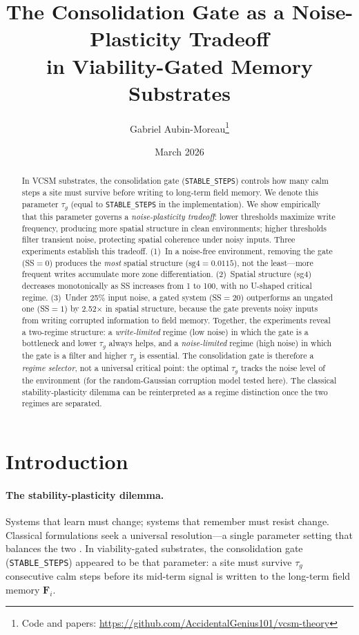 \documentclass[11pt,twocolumn]{article}
\title{\textbf{The Consolidation Gate as a Noise-Plasticity Tradeoff\\
in Viability-Gated Memory Substrates}}
\author{Gabriel Aubin-Moreau\thanks{Code and papers: \url{https://github.com/AccidentalGenius101/vcsm-theory}}}
\date{March 2026}
\begin{document}
\maketitle

\begin{abstract}
In VCSM substrates, the consolidation gate (\texttt{STABLE\_STEPS}) controls
how many calm steps a site must survive before writing to long-term field memory.
We denote this parameter $\tau_g$ (equal to \texttt{STABLE\_STEPS} in the implementation).
We show empirically that this parameter governs a \emph{noise-plasticity tradeoff}:
lower thresholds maximize write frequency, producing more spatial structure in
clean environments; higher thresholds filter transient noise, protecting spatial
coherence under noisy inputs.
Three experiments establish this tradeoff.
(1)~In a noise-free environment, removing the gate (SS$=0$) produces the
\emph{most} spatial structure ($\text{sg4} = 0.0115$), not the least---more
frequent writes accumulate more zone differentiation.
(2)~Spatial structure (sg4) decreases monotonically as SS increases from 1 to 100,
with no U-shaped critical regime.
(3)~Under 25\% input noise, a gated system (SS$=20$) outperforms an ungated
one (SS$=1$) by 2.52$\times$ in spatial structure, because the gate prevents
noisy inputs from writing corrupted information to field memory.
Together, the experiments reveal a two-regime structure: a \emph{write-limited}
regime (low noise) in which the gate is a bottleneck and lower $\tau_g$ always
helps, and a \emph{noise-limited} regime (high noise) in which the gate is a
filter and higher $\tau_g$ is essential.
The consolidation gate is therefore a \emph{regime selector}, not a universal
critical point: the optimal $\tau_g$ tracks the noise level of the environment
(for the random-Gaussian corruption model tested here).
The classical stability-plasticity dilemma can be reinterpreted as a regime distinction once the two regimes are separated.
\end{abstract}

\section{Introduction}

\paragraph{The stability-plasticity dilemma.}
Systems that learn must change; systems that remember must resist change.
Classical formulations seek a universal resolution---a single parameter setting
that balances the two \cite{grossberg1980}. In viability-gated substrates,
the consolidation gate (\texttt{STABLE\_STEPS}) appeared to be that parameter:
a site must survive $\tau_g$ consecutive calm steps before its mid-term signal
is written to the long-term field memory $\mathbf{F}_i$.
\end{document}

